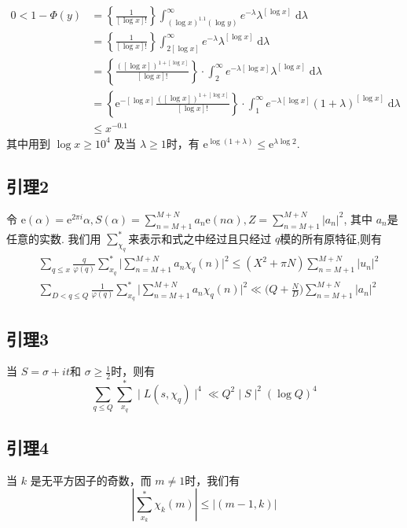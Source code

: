 \documentclass{article}
\newcommand{\ee}{\mathrm{e}}
\newcommand{\dd}{\;\mathrm{d}}
\begin{document}
\begin{align*}
    0 < 1-\Phi(y)
    & = \left\{\frac{1}{[\log x]!}\right\}\int_{(\log x)^{1.1}(\log y)}^{\infty}e^{-\lambda}\lambda^{[\log x]}\dd\lambda \\
    & = \left\{\frac{1}{[\log x]!}\right\}\int_{2[\log x]}^{\infty}e^{-\lambda}\lambda^{[\log x]}\dd\lambda \\
    & = \left\{\frac{\left(\left[\log x\right]\right)^{1+\left[\log x\right]}}{\left[\log x\right]!}\right\}
        \cdot \int_{2}^{\infty}e^{-\lambda[\log x]}\lambda^{[\log x]}\dd\lambda \\
    & = \left\{\ee^{-[\log x]}\frac{\left(\left[\log x\right]\right)^{1+\left[\log x\right]}}{\left[\log x\right]!}\right\}
        \cdot \int_{1}^{\infty}e^{-\lambda[\log x]}(1+\lambda)^{[\log x]}\dd\lambda \\
    & \le x^{-0.1}
\end{align*}
其中用到 $\log x\ge 10^4$ 及当 $\lambda\ge 1$时，有 $\ee^{\log(1+\lambda)}\le \ee^{\lambda\log 2}$.



\subsection{引理2}
令 $\ee(\alpha) = \ee^{2\pi i}\alpha, S(\alpha) = \sum_{n=M+1}^{M+N}{a_n\ee(n\alpha)}, Z = \sum_{n=M+1}^{M+N}{|a_n|^2}$,
其中 $a_n$是任意的实数. 我们用 $\sum_{\chi_q}^{*}$来表示和式之中经过且只经过 $q$模的所有原特征,则有
\begin{align}
    & \sum_{q\leq x}\frac{q}{\varphi(q)}\sum_{x_{q}}^{*}\Big|\sum_{n=M+1}^{M+N}a_{n}\chi_{q}(n)\Big|^{2}\le (X^{2}+\pi N)\sum_{n=M+1}^{M+N}\Big|u_{n}\Big|^{2} \\
    & \sum_{D<q\leq Q}\frac{1}{\varphi(q)}\sum_{x_{q}}^{*}\Big|\sum_{n=M+1}^{M+N}a_{n}\chi_{q}(n)\Big|^{2}\ll\Big(Q+\frac{N}{D}\Big)\sum_{n=M+1}^{M+N}|a_{n}|^{2}
\end{align}







\subsection{引理3}
当 $S=\sigma+it$和 $\sigma\ge \frac12$时，则有
\[
    \sum_{q\le Q}\sum_{x_{q}}^{*}\mid L(s,\chi_{q})\mid^{4}\ll Q^{2}\mid S\mid^{2}(\log Q)^{4} 
\]



\subsection{引理4}
当 $k$ 是无平方因子的奇数，而 $m\neq 1$时，我们有
\[
    \left|\sum_{x_k}^*\chi_k(m)\right|\le\left|(m-1,k)\right|   
\]
\end{document}
